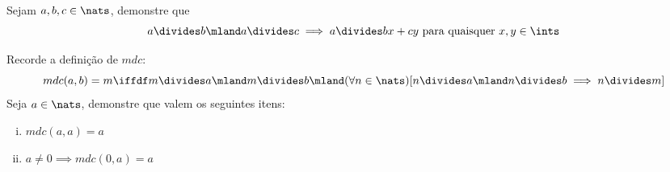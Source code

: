 \begin{exercise}
%
	Sejam $a,b,c \in \nats$, demonstre que
	$$a \divides b \mland a \divides c \implies a \divides bx + cy \text{ para quaisquer } x,y \in \ints$$
\end{exercise}

\begin{exercise}
%
%
	Recorde a definição de $mdc$:
	$$
	mdc(a,b) = m \iffdf m \divides a \mland m \divides b \mland (\forall n \in \nats)[ n \divides a \mland n \divides b \implies n \divides m]
	$$
	Seja $a \in \nats$, demonstre que valem os seguintes itens:
	\begin{enumerate}[(i)]
		\item $mdc(a,a) = a$
		\item $a \neq 0 \implies mdc(0,a) = a$
	\end{enumerate}
\end{exercise}
